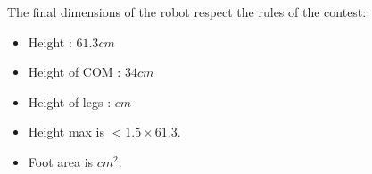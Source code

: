 The final dimensions of the robot respect the rules of the contest:
\begin{itemize}
\item Height : $61.3cm$
\item Height of COM : $34cm$
\item Height of legs : $cm$
\item Height max is $< 1.5 \times 61.3$.
\item Foot area is $ cm^2$.
\end{itemize}
